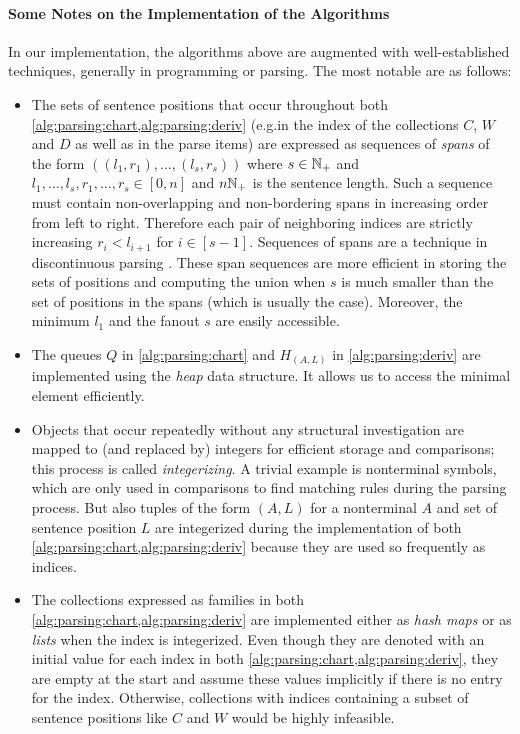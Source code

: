 \documentclass[../../document.tex]{subfiles}
\begin{document}
    \paragraph{Some Notes on the Implementation of the Algorithms}
    In our implementation, the algorithms above are augmented with well-established techniques, generally in programming or parsing.
    The most notable are as follows:
    \begin{itemize}
        \item The sets of sentence positions that occur throughout both \cref{alg:parsing:chart,alg:parsing:deriv} (e.g.\@ in the index of the collections \(C\), \(W\) and \(D\) as well as in the parse items) are expressed as sequences of \emph{spans} of the form \(((l_1, r_1), \ldots, (l_s, r_s))\) where \(s \in \mathbb{N}_+\) and \(l_1,\ldots,l_s,r_1,\ldots,r_s \in [0,n]\) and \(n \mathbb{N}_+\) is the sentence length.
            Such a sequence must contain non-overlapping and non-bordering spans in increasing order from left to right. Therefore each pair of neighboring indices are strictly increasing \(r_i < l_{i+1}\) for \(i \in [s-1]\).
            Sequences of spans are a technique in discontinuous parsing \citep[e.g.][cf.\@ range vector in Definition~6.6]{Kal10}.
            These span sequences are more efficient in storing the sets of positions and computing the union when \(s\) is much smaller than the set of positions in the spans (which is usually the case).
            Moreover, the minimum \(l_1\) and the fanout \(s\) are easily accessible.
        \item The queues \(Q\) in \cref{alg:parsing:chart} and \(H_{(A,L)}\) in \cref{alg:parsing:deriv} are implemented using the \emph{heap} data structure.
            It allows us to access the minimal element efficiently.
        \item Objects that occur repeatedly without any structural investigation are mapped to (and replaced by) integers for efficient storage and comparisons; this process is called \emph{integerizing}.
            A trivial example is nonterminal symbols, which are only used in comparisons to find matching rules during the parsing process.
            But also tuples of the form \((A, L)\) for a nonterminal \(A\) and set of sentence position \(L\) are integerized during the implementation of both \cref{alg:parsing:chart,alg:parsing:deriv} because they are used so frequently as indices.
        \item The collections expressed as families in both \cref{alg:parsing:chart,alg:parsing:deriv} are implemented either as \emph{hash maps} or as \emph{lists} when the index is integerized.
            Even though they are denoted with an initial value for each index in both \cref{alg:parsing:chart,alg:parsing:deriv}, they are empty at the start and assume these values implicitly if there is no entry for the index.
            Otherwise, collections with indices containing a subset of sentence positions like \(C\) and \(W\) would be highly infeasible.
    \end{itemize}
\end{document}
